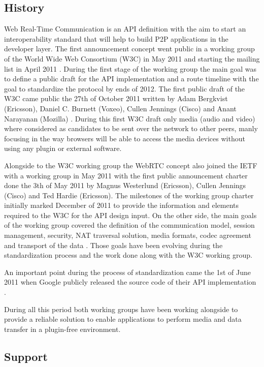 \subsection{History}

Web Real-Time Communication is an API definition with the aim to start an interoperability standard that will help to build P2P applications in the developer layer. The first announcement concept went public in a working group of the World Wide Web Consortium (W3C) in May 2011 \cite{webrtcW3cgroup} and starting the mailing list in April 2011 \cite{welcomeW3C}. During the first stage of the working group the main goal was to define a public draft for the API implementation and a route timeline with the goal to standardize the protocol by ends of 2012. The first public draft of the W3C came public the 27th of October 2011 written by Adam Bergkvist (Ericsson), Daniel C. Burnett (Voxeo), Cullen Jennings (Cisco) and Anant Narayanan (Mozilla) \cite{originalW3Cdraft}. During this first W3C draft only media (audio and video) where considered as candidates to be sent over the network to other peers, manly focusing in the way browsers will be able to access the media devices without using any plugin or external software.

Alongside to the W3C working group the WebRTC concept also joined the IETF with a working group in May 2011 \cite{webrtcIETFgroup} with the first public announcement charter done the 3th of May 2011 by Magnus Westerlund (Ericsson), Cullen Jennings (Cisco) and Ted Hardie (Ericsson). The milestones of the working group charter initially marked December of 2011 to provide the information and elements required to the W3C for the API design input. On the other side, the main goals of the working group covered the definition of the communication model, session management, security, NAT traversal solution, media formats, codec agreement and transport of the data \cite{webrtcIETFcharter}. Those goals have been evolving during the standardization process and the work done along with the W3C working group.

An important point during the process of standardization came the 1st of June 2011 when Google publicly released the source code of their API implementation \cite{haraldpublicWebRTC}. 

During all this period both working groups have been working alongside to provide a reliable solution to enable applications to perform media and data transfer in a plugin-free environment.

\subsection{Support}

